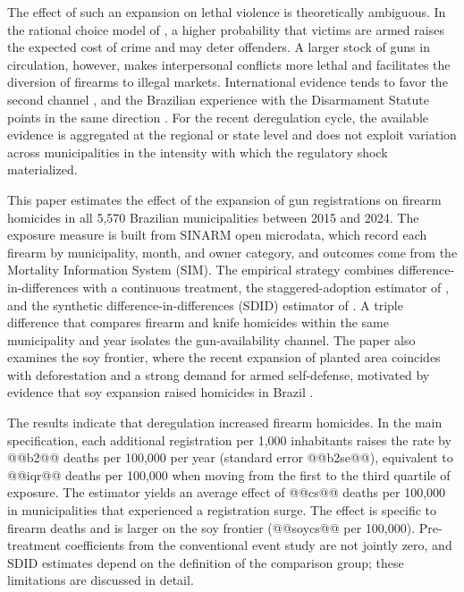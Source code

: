 \documentclass[11pt,a4paper]{article}
\begin{document}
The effect of such an expansion on lethal violence is theoretically ambiguous. In the rational choice model of \citet{becker1968}, a higher probability that victims are armed raises the expected cost of crime and may deter offenders. A larger stock of guns in circulation, however, makes interpersonal conflicts more lethal and facilitates the diversion of firearms to illegal markets. International evidence tends to favor the second channel \citep{duggan2001,cook2006}, and the Brazilian experience with the Disarmament Statute points in the same direction \citep{souza2007,cerqueira2012}. For the recent deregulation cycle, the available evidence is aggregated at the regional or state level \citep{baculi2021,wakim2025} and does not exploit variation across municipalities in the intensity with which the regulatory shock materialized.

This paper estimates the effect of the expansion of gun registrations on firearm homicides in all 5,570 Brazilian municipalities between 2015 and 2024. The exposure measure is built from SINARM open microdata, which record each firearm by municipality, month, and owner category, and outcomes come from the Mortality Information System (SIM). The empirical strategy combines difference-in-differences with a continuous treatment, the staggered-adoption estimator of \citet{callaway2021}, and the synthetic difference-in-differences (SDID) estimator of \citet{arkhangelsky2021}. A triple difference that compares firearm and knife homicides within the same municipality and year isolates the gun-availability channel. The paper also examines the soy frontier, where the recent expansion of planted area coincides with deforestation and a strong demand for armed self-defense, motivated by evidence that soy expansion raised homicides in Brazil \citep{moreno2024}.

The results indicate that deregulation increased firearm homicides. In the main specification, each additional registration per 1,000 inhabitants raises the rate by @@b2@@ deaths per 100,000 per year (standard error @@b2se@@), equivalent to @@iqr@@ deaths per 100,000 when moving from the first to the third quartile of exposure. The \citet{callaway2021} estimator yields an average effect of @@cs@@ deaths per 100,000 in municipalities that experienced a registration surge. The effect is specific to firearm deaths and is larger on the soy frontier (@@soycs@@ per 100,000). Pre-treatment coefficients from the conventional event study are not jointly zero, and SDID estimates depend on the definition of the comparison group; these limitations are discussed in detail.
\end{document}
